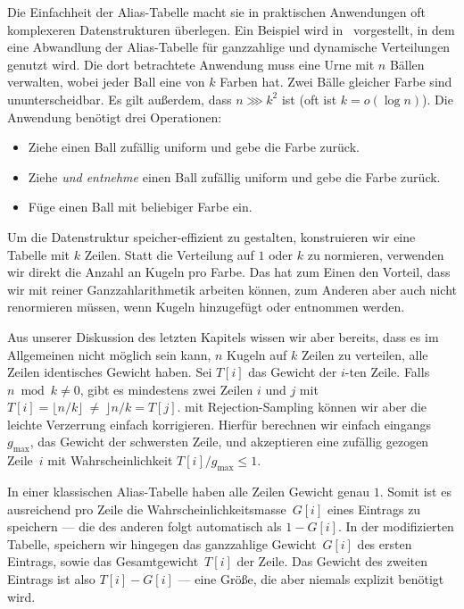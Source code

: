 Die Einfachheit der Alias-Tabelle macht sie in praktischen Anwendungen oft komplexeren Datenstrukturen überlegen.
Ein Beispiel wird in~\cite{DBLP:conf/esa/BerenbrinkHK0PT20} vorgestellt, in dem eine Abwandlung der Alias-Tabelle für ganzzahlige und dynamische Verteilungen genutzt wird.
Die dort betrachtete Anwendung muss eine Urne mit $n$ Bällen verwalten, wobei jeder Ball eine von $k$ Farben hat.
Zwei Bälle gleicher Farbe sind ununterscheidbar.
Es gilt außerdem, dass $n \ggg k^2$ ist (oft ist $k = o(\log n)$).
Die Anwendung benötigt drei Operationen:
\begin{itemize}
    \item Ziehe einen Ball zufällig uniform und gebe die Farbe zurück.
    \item Ziehe \emph{und entnehme} einen Ball zufällig uniform und gebe die Farbe zurück.
    \item Füge einen Ball mit beliebiger Farbe ein.
\end{itemize}

Um die Datenstruktur speicher-effizient zu gestalten, konstruieren wir eine Tabelle mit $k$ Zeilen.
Statt die Verteilung auf $1$ oder $k$ zu normieren, verwenden wir direkt die Anzahl an Kugeln pro Farbe.
Das hat zum Einen den Vorteil, dass wir mit reiner Ganzzahlarithmetik arbeiten können, zum Anderen aber auch nicht renormieren müssen, wenn Kugeln hinzugefügt oder entnommen werden.

Aus unserer Diskussion des letzten Kapitels wissen wir aber bereits, dass es im Allgemeinen nicht möglich sein kann, $n$ Kugeln auf $k$ Zeilen zu verteilen, \sd alle Zeilen identisches Gewicht haben.
Sei $T[i]$ das Gewicht der $i$-ten Zeile.
Falls $n \bmod k \ne 0$, gibt es mindestens zwei Zeilen $i$ und $j$ mit  $T[i] = \lfloor n / k \rfloor\ \ne\ \rfloor n / k = T[j]$.
mit Rejection-Sampling können wir aber die leichte Verzerrung einfach korrigieren.
Hierfür berechnen wir einfach eingangs $g_\text{max}$, das Gewicht der schwersten Zeile, und akzeptieren eine zufällig gezogen Zeile~$i$ mit Wahrscheinlichkeit $T[i] / g_\text{max} \le 1$.

In einer klassischen Alias-Tabelle haben alle Zeilen Gewicht genau $1$.
Somit ist es ausreichend pro Zeile die Wahrscheinlichkeitsmasse~$G[i]$ eines Eintrags zu speichern --- die des anderen folgt automatisch als $1 - G[i]$.
In der modifizierten Tabelle, speichern wir hingegen das ganzzahlige Gewicht~$G[i]$ des ersten Eintrags, sowie das Gesamtgewicht~$T[i]$ der Zeile.
Das Gewicht des zweiten Eintrags ist also $T[i] - G[i]$ --- eine Größe, die aber niemals explizit benötigt wird.

